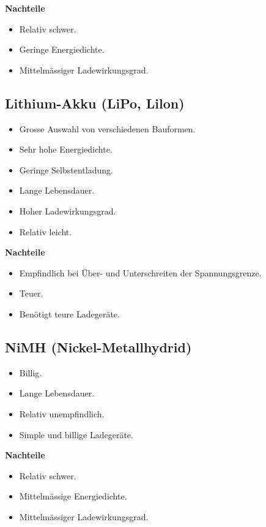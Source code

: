 \textbf {Nachteile}
\begin{itemize}
\item Relativ schwer.
\item Geringe Energiedichte.
\item Mittelmässiger Ladewirkungsgrad.
\end{itemize}

\subsection {Lithium-Akku (LiPo, Lilon)}

\begin{itemize}
\item Grosse Auswahl von verschiedenen Bauformen.
\item Sehr hohe Energiedichte.
\item Geringe Selbstentladung.
\item Lange Lebensdauer.
\item Hoher Ladewirkungsgrad.
\item Relativ leicht.
\end{itemize}

\textbf {Nachteile}
\begin{itemize}
\item Empfindlich bei Über- und Unterschreiten der Spannungsgrenze.
\item Teuer.	
\item Benötigt teure Ladegeräte.	
\end{itemize}

\subsection {NiMH (Nickel-Metallhydrid)}
\begin{itemize}
\item Billig.
\item Lange Lebensdauer.
\item Relativ unempfindlich.
\item Simple und billige Ladegeräte.
\end{itemize}

\textbf {Nachteile}
\begin{itemize}
\item Relativ schwer.
\item Mittelmässige Energiedichte.
\item Mittelmässiger Ladewirkungsgrad.
\end{itemize}

